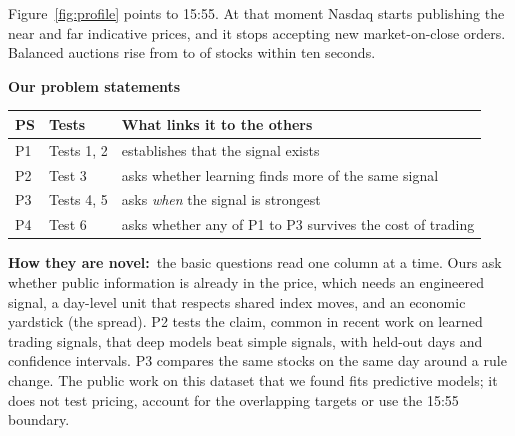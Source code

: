 \documentclass[10pt,a4paper,twocolumn]{article}
\newcommand{\field}[2]{\textbf{#1}~#2\par}
\newcommand{\minihead}[1]{\par\needspace{8\baselineskip}\smallskip\textbf{#1}\par}
\begin{document}
Figure~\ref{fig:profile} points to 15:55. At that moment Nasdaq starts publishing the near and far indicative prices,
and it stops accepting new market-on-close orders. Balanced auctions rise from \nBalancedPre{} to \nBalancedPost{} of
stocks within ten seconds.


\minihead{Our problem statements}
\noindent{}

{\footnotesize
\begin{tabularx}{\linewidth}{@{}L{0.7cm} L{2.0cm} Y@{}}
\toprule
\textbf{PS} & \textbf{Tests} & \textbf{What links it to the others} \\
\midrule
P1 & Tests 1, 2 & establishes that the signal exists \\
P2 & Test 3 & asks whether learning finds more of the same signal \\
P3 & Tests 4, 5 & asks \emph{when} the signal is strongest \\
P4 & Test 6 & asks whether any of P1 to P3 survives the cost of trading \\
\bottomrule
\end{tabularx}}

\field{How they are novel:}{the basic questions read one column at a time. Ours ask whether public information is
already in the price, which needs an engineered signal, a day-level unit that respects shared index moves, and an
economic yardstick (the spread). P2 tests the claim, common in recent work on learned trading signals, that deep
models beat simple signals, with held-out days and confidence intervals. P3 compares the same stocks on the same day
around a rule change. The public work on this dataset that we found fits predictive models; it does not test
pricing, account for the overlapping targets or use the 15:55 boundary.}
\end{document}
